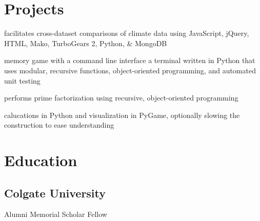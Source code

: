 \documentclass[letterpaper]{deedy-resume} %
\begin{document}
\begin{minipage}[t]{0.33\textwidth}
\section{Projects} 


facilitates cross-dataset comparisons of climate data using JavaScript, jQuery, HTML, Mako, TurboGears 2, Python, \& MongoDB \\
\sectionspace %

memory game with a command line interface a terminal written in Python that uses modular, recursive functions, object-oriented programming, and automated unit testing \\
\sectionspace %

performs prime factorization using recursive, object-oriented programming \\
\sectionspace %

calucations in Python and visualization in PyGame, optionally slowing the construction to ease understanding \\
\sectionspace %


\section{Education} 

\subsection{Colgate University}

Alumni Memorial Scholar Fellow \\


\end{minipage}
\end{document}
